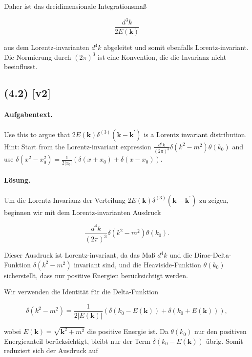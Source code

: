 \documentclass[11pt,a4paper]{article}
\begin{document}
Daher ist das dreidimensionale Integrationsmaß

\[
\frac{d^3 k}{2 E(\mathbf{k})}
\]

aus dem Lorentz-invarianten \(d^4 k\) abgeleitet und somit ebenfalls Lorentz-invariant. Die Normierung durch \((2 \pi)^3\) ist eine Konvention, die die Invarianz nicht beeinflusst.


\subsection*{(4.2) [v2]}
\paragraph{Aufgabentext.}
Use this to argue that $2 E(\mathbf{k}) \delta^{(3)}\left(\mathbf{k}-\mathbf{k}^{\prime}\right)$ is a Lorentz invariant distribution.
Hint: Start from the Lorentz-invariant expression $\frac{d^4 k}{(2 \pi)^3} \delta\left(k^2-m^2\right) \theta\left(k_0\right)$ and use $\delta\left(x^2-x_0^2\right)=\frac{1}{2\left|x_0\right|}\left(\delta\left(x+x_0\right)+\delta\left(x-x_0\right)\right)$.

\paragraph{Lösung.}
Um die Lorentz-Invarianz der Verteilung $2 E(\mathbf{k}) \delta^{(3)}\left(\mathbf{k}-\mathbf{k}^{\prime}\right)$ zu zeigen, beginnen wir mit dem Lorentz-invarianten Ausdruck

\[
\frac{d^4 k}{(2 \pi)^3} \delta\left(k^2-m^2\right) \theta\left(k_0\right).
\]

Dieser Ausdruck ist Lorentz-invariant, da das Maß $d^4 k$ und die Dirac-Delta-Funktion $\delta\left(k^2-m^2\right)$ invariant sind, und die Heaviside-Funktion $\theta\left(k_0\right)$ sicherstellt, dass nur positive Energien berücksichtigt werden.

Wir verwenden die Identität für die Delta-Funktion

\[
\delta\left(k^2-m^2\right) = \frac{1}{2|E(\mathbf{k})|} \left( \delta\left(k_0 - E(\mathbf{k})\right) + \delta\left(k_0 + E(\mathbf{k})\right) \right),
\]

wobei $E(\mathbf{k}) = \sqrt{\mathbf{k}^2 + m^2}$ die positive Energie ist. Da $\theta(k_0)$ nur den positiven Energieanteil berücksichtigt, bleibt nur der Term $\delta\left(k_0 - E(\mathbf{k})\right)$ übrig. Somit reduziert sich der Ausdruck auf
\end{document}
